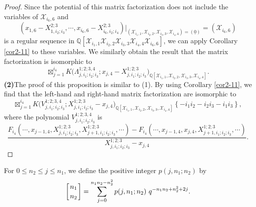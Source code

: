 \documentclass[10pt]{amsart}
\theoremstyle{break}
\begin{document}
\begin{proof}
Since the potential of this matrix factorization does not include the variables of $\mathcal{X}_{i_6,6}$ and
\begin{equation*}
(x_{1,6}-X^{2;3}_{1,i_2;i_3},\cdots ,x_{i_6,6}-X^{2;3}_{i_6,i_2;i_4})|_{(\mathcal{X}_{i_{1},1},\mathcal{X}_{i_{2},2},\mathcal{X}_{i_{3},3},\mathcal{X}_{i_{4},4})=(\underline{0})}=(\mathcal{X}_{i_{6},6})
\end{equation*}
is a regular sequence in ${{\mathbb{Q}}}[\mathcal{X}_{i_{1},1}\mathcal{X}_{i_{2},2}\mathcal{X}_{i_{3},3}\mathcal{X}_{i_{4},4}\mathcal{X}_{i_{6},6}]$, we can apply Corollary \ref{cor2-11} to these variables. We similarly obtain the result that the matrix factorization is isomorphic to
$$
\mathop{\boxtimes}_{j=1}^{i_4} K\Big( \Lambda_{j,i_1;i_2;i_3}^{1;2;3,4} ;x_{j,4}-X^{1;2;3}_{j,i_1;i_2;i_3} \Big)_{{{\mathbb{Q}}} [\mathcal{X}_{i_{1},1},\mathcal{X}_{i_{2},2},\mathcal{X}_{i_{3},3},\mathcal{X}_{i_{4},4}] }. 
$$
{\bf (2)}The proof of this proposition is similar to (1). By using Corollary \ref{cor2-11}, we find that the left-hand and right-hand matrix factorization are isomorphic to
$$
\mathop{\boxtimes}_{j=1}^{i_4} K\Big( V_{j,i_1;i_2;i_3}^{1;2;3,4} ;X^{1;2;3}_{j,i_1;i_2;i_3}-x_{j,4} \Big)_{{{\mathbb{Q}}} [\mathcal{X}_{i_{1},1},\mathcal{X}_{i_{2},2},\mathcal{X}_{i_{3},3},\mathcal{X}_{i_{4},4}] } \left\{ -i_1 i_2-i_2 i_3-i_1 i_3 \right\},
$$
where the polynomial $V_{j,i_1;i_2;i_3}^{1;2;3,4}$ is
$$
\frac{F_{i_4}(\cdots ,x_{j-1,4} ,X_{j,i_1;i_2;i_3}^{1;2;3},X_{j+1,i_1;i_2;i_3}^{1;2;3},\cdots )-F_{i_4}(\cdots ,x_{j-1,4} ,x_{j,4},X_{j+1,i_1;i_2;i_3}^{1;2;3},\cdots )}{X_{j,i_1;i_2;i_3}^{1;2;3}-x_{j,4}}.
$$
\end{proof}

For $0 \leq n_2 \leq j \leq n_1$, we define the positive integer $p(j,n_1;n_2)$ by
$$
\left[ {n_1}\atop{n_2} \right] = \sum_{j=0}^{n_1 n_2-n_2^2} p(j,n_1;n_2) \ q^{-n_1 n_2+n_2^2+2j}.
$$
\end{document}
